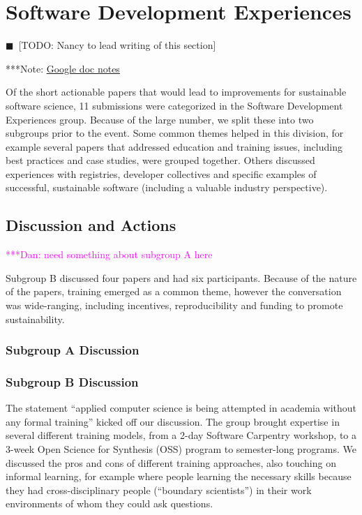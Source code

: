 \documentclass[11pt, oneside]{amsart}
\newcommand{\todo}[1]{{\color{blue}$\blacksquare$~\textsf{[TODO: #1]}}}
\newcommand{\note}[1]{ {\textcolor{blueish}    { ***Note:      #1 }}}
\newcommand{\katznote}[1]{ {\textcolor{magenta}    { ***Dan:      #1 }}}
\begin{document}
\section{Software Development Experiences} \label{sec:devel}
\todo{Nancy to lead writing of this section}

\note{\href{http://tinyurl.com/pn4eq8z}{Google doc notes}}

Of the short actionable papers that would lead to improvements for sustainable
software science, 11 submissions were categorized in the  Software Development Experiences
group. Because of the large number, we split these into two subgroups
prior to the event. Some common themes helped in this division, for
example several papers that addressed education and training issues,
including best practices and case studies, were grouped
together. Others discussed experiences with registries, developer
collectives and specific examples of successful, sustainable software
(including a valuable industry perspective).
 
\subsection{Discussion and Actions}

\katznote{need something about subgroup A here}

Subgroup B discussed four papers and had six
participants. Because of the nature of the papers, training emerged as a
common theme, however the conversation was wide-ranging, including
incentives, reproducibility and funding to promote sustainability.

\subsubsection{Subgroup A Discussion}

\subsubsection{Subgroup B Discussion}
The statement ``applied computer science is being attempted in academia
without any formal training'' kicked off our discussion. The group brought
expertise in several different training models, from a 2-day Software
Carpentry workshop, to a 3-week Open Science for Synthesis (OSS) program
to semester-long programs. We discussed the pros and cons of different
training approaches, also touching on informal learning, for example where
people learning the necessary skills because they had cross-disciplinary
people (``boundary scientists'') in their work environments of whom they
could ask questions.
\end{document}
